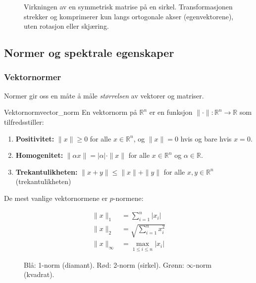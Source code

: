 \documentclass[../../main.tex]{subfiles}
\begin{document}
\begin{figure}
    \centering
    
    \caption{Virkningen av en symmetrisk matrise på en sirkel. Transformasjonen strekker og komprimerer kun langs ortogonale akser (egenvektorene), uten rotasjon eller skjæring.}
    \label{fig:symmetric_action}
\end{figure}

\subsection{Normer og spektrale egenskaper}

\subsubsection{Vektornormer}
Normer gir oss en måte å måle \emph{størrelsen} av vektorer og matriser.

\begin{definition}{Vektornorm}{vector_norm}
    En vektornorm på $\mathbb{R}^n$ er en funksjon $\|\cdot\| : \mathbb{R}^n \to \mathbb{R}$ som tilfredsstiller:
    \begin{enumerate}
        \item \textbf{Positivitet:} $\|x\| \geq 0$ for alle $x \in \mathbb{R}^n$, og $\|x\| = 0$ hvis og bare hvis $x = 0$.
        \item \textbf{Homogenitet:} $\|\alpha x\| = |\alpha| \cdot \|x\|$ for alle $x \in \mathbb{R}^n$ og $\alpha \in \mathbb{R}$.
        \item \textbf{Trekantulikheten:} $\|x + y\| \leq \|x\| + \|y\|$ for alle $x,y \in \mathbb{R}^n$ (trekantulikheten)
    \end{enumerate}
\end{definition}

De mest vanlige vektornormene er $p$-normene:

\begin{align*}
    \|x\|_1      & = \sum_{i=1}^n |x_i| \tag{taxicab}            \\
    \|x\|_2      & = \sqrt{\sum_{i=1}^n x_i^2} \tag{euklidisk}   \\
    \|x\|_\infty & = \max_{1 \leq i \leq n} |x_i| \tag{maksnorm}
\end{align*}


\begin{figure}
    \centering
    
    \caption{Blå: 1-norm (diamant). Rød: 2-norm (sirkel). Grønn: $\infty$-norm (kvadrat).}
    \label{fig:vector_norms}
\end{figure}
\end{document}
